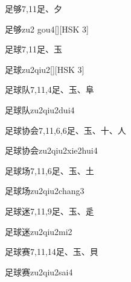 \begin{entry}{足够}{7,11}{⾜、⼣}
  \begin{phonetics}{足够}{zu2 gou4}[][HSK 3]
  \end{phonetics}
\end{entry}

\begin{entry}{足球}{7,11}{⾜、⽟}
  \begin{phonetics}{足球}{zu2qiu2}[][HSK 3]
  \end{phonetics}
\end{entry}

\begin{entry}{足球队}{7,11,4}{⾜、⽟、⾩}
  \begin{phonetics}{足球队}{zu2qiu2dui4}
  \end{phonetics}
\end{entry}

\begin{entry}{足球协会}{7,11,6,6}{⾜、⽟、⼗、⼈}
  \begin{phonetics}{足球协会}{zu2qiu2xie2hui4}
  \end{phonetics}
\end{entry}

\begin{entry}{足球场}{7,11,6}{⾜、⽟、⼟}
  \begin{phonetics}{足球场}{zu2qiu2chang3}
  \end{phonetics}
\end{entry}

\begin{entry}{足球迷}{7,11,9}{⾜、⽟、⾡}
  \begin{phonetics}{足球迷}{zu2qiu2mi2}
  \end{phonetics}
\end{entry}

\begin{entry}{足球赛}{7,11,14}{⾜、⽟、⾙}
  \begin{phonetics}{足球赛}{zu2qiu2sai4}
  \end{phonetics}
\end{entry}

